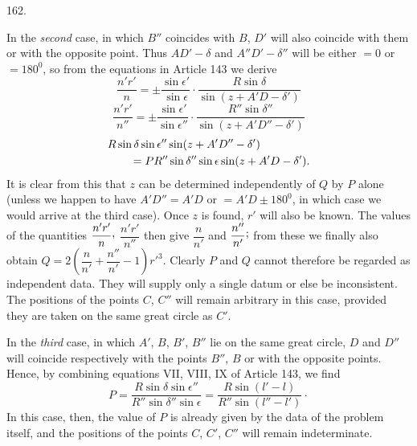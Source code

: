 \par{}\medskip
\begin{center}\hypertarget{native-225-article162}{}162.\end{center}
In the \emph{second} case, in which $B''$ coincides with $B$, $D'$ will also coincide with them or with the opposite point. Thus $AD'-\delta$ and $A''D'-\delta''$ will be either $=0$ or $=180^0$, so from the equations in Article 143 we derive
\[
\frac{n'r'}{n}=\pm\frac{\sin\epsilon'}{\sin\epsilon}\cdot
\frac{R\sin\delta}{\sin(z+A'D-\delta')}
\]
\[
\frac{n'r'}{n''}=\pm\frac{\sin\epsilon'}{\sin\epsilon''}\cdot
\frac{R''\sin\delta''}{\sin(z+A'D''-\delta')}
\]
\[
\begin{aligned}
&R\sin\delta\sin\epsilon''\sin(z+A'D''-\delta')\notag\\
&\qquad=PR''\sin\delta''\sin\epsilon\sin(z+A'D-\delta').
\end{aligned}
\]
It is clear from this that $z$ can be determined independently of $Q$ by $P$ alone (unless we happen to have $A'D''=A'D$ or $=A'D\pm180^0$, in which case we would arrive at the third case). Once $z$ is found, $r'$ will also be known. The values of the quantities $\dfrac{n'r'}{n}\mathpunct{\raisebox{.45ex}{,}}$
$\dfrac{n'r'}{n''}$ then give $\dfrac{n}{n'}$ and $\dfrac{n''}{n'}\mathpunct{\raisebox{.45ex}{;}}$ from these we finally also obtain $Q=2\left(\dfrac{n}{n'}+\dfrac{n''}{n'}-1\right)r'^3$. Clearly $P$ and $Q$ cannot therefore be regarded as independent data. They will supply only a single datum or else be inconsistent. The positions of the points $C$, $C''$ will remain arbitrary in this case, provided they are taken on the same great circle as $C'$.

In the \emph{third} case, in which $A'$, $B$, $B'$, $B''$ lie on the same great circle, $D$ and $D''$ will coincide respectively with the points $B''$, $B$ or with the opposite points. Hence, by combining equations VII, VIII, IX of Article 143, we find
\[
P=\frac{R\sin\delta\sin\epsilon''}{R''\sin\delta''\sin\epsilon}
=\frac{R\sin(l'-l)}{R''\sin(l''-l')}\mathpunct{\cdot}
\]
In this case, then, the value of $P$ is already given by the data of the problem itself, and the positions of the points $C$, $C'$, $C''$ will remain indeterminate.
